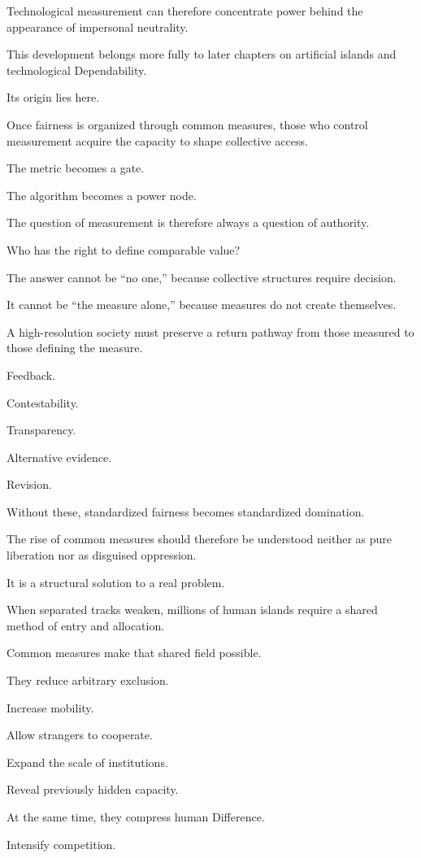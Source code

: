 Technological measurement can therefore concentrate power behind the appearance of impersonal neutrality.

This development belongs more fully to later chapters on artificial islands and technological Dependability.

Its origin lies here.

Once fairness is organized through common measures, those who control measurement acquire the capacity to shape collective access.

The metric becomes a gate.

The algorithm becomes a power node.

The question of measurement is therefore always a question of authority.

Who has the right to define comparable value?

The answer cannot be “no one,” because collective structures require decision.

It cannot be “the measure alone,” because measures do not create themselves.

A high-resolution society must preserve a return pathway from those measured to those defining the measure.

Feedback.

Contestability.

Transparency.

Alternative evidence.

Revision.

Without these, standardized fairness becomes standardized domination.

The rise of common measures should therefore be understood neither as pure liberation nor as disguised oppression.

It is a structural solution to a real problem.

When separated tracks weaken, millions of human islands require a shared method of entry and allocation.

Common measures make that shared field possible.

They reduce arbitrary exclusion.

Increase mobility.

Allow strangers to cooperate.

Expand the scale of institutions.

Reveal previously hidden capacity.

At the same time, they compress human Difference.

Intensify competition.

